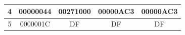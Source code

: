 \begin{table}[!ht]
{\begin{tabular}{|c|c|cc|c|}
            4                                                                     & 00000044               & \multicolumn{1}{c|}{00271000}                                                        & 00000AC3                                                           & 00000AC3                                                                                                     \\ \hline
            5                                                                     & 0000001C               & \multicolumn{1}{c|}{DF}                                                              & DF                                                                 & DF                                                                                                           \\ \hline
        \end{tabular}%
    }
\end{table}